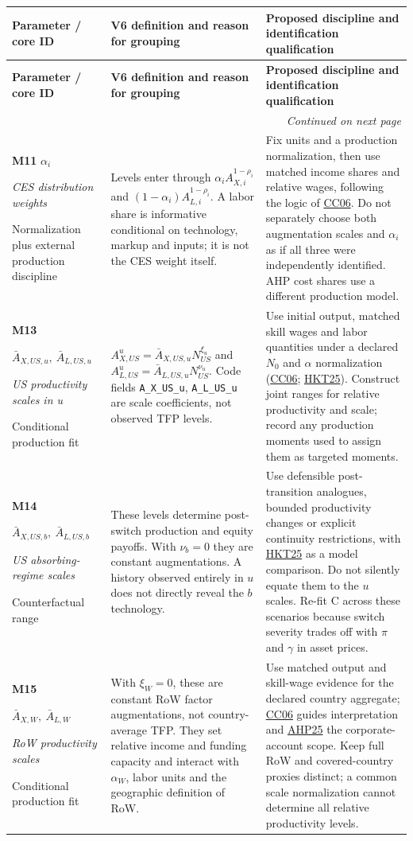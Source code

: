 \documentclass[10pt,a4paper,landscape]{article}
\makeatletter
\newcommand{\code}[1]{{\footnotesize\texttt{#1}}}
\newcommand{\lit}[2]{\hyperlink{ref:#1}{#2}}
\newenvironment{grouptable}{%
\fontsize{9.4}{10.8}\selectfont\setlength{\parskip}{1.5pt}
\begin{longtable}{@{}P{\dimexpr .18\textwidth-6.67pt\relax}P{\dimexpr .385\textwidth-6.67pt\relax}P{\dimexpr .435\textwidth-6.66pt\relax}@{}}
\toprule\rowcolor{tablehead}\textbf{Parameter / core ID} & \textbf{V6 definition and reason for grouping} & \textbf{Proposed discipline and identification qualification}\\\midrule
\endfirsthead
\toprule\rowcolor{tablehead}\textbf{Parameter / core ID} & \textbf{V6 definition and reason for grouping} & \textbf{Proposed discipline and identification qualification}\\\midrule
\endhead
\midrule\multicolumn{3}{r}{\footnotesize\itshape Continued on next page}\\\endfoot
\bottomrule\endlastfoot
}{\end{longtable}}
\makeatother
\begin{document}
\begin{grouptable}
\textbf{M11} $\alpha_i$\par \textit{CES distribution weights}\par {\footnotesize Normalization plus external production discipline} & Levels enter through $\alpha_iA_{X,i}^{1-\rho_i}$ and $(1-\alpha_i)A_{L,i}^{1-\rho_i}$. A labor share is informative conditional on technology, markup and inputs; it is not the CES weight itself. & Fix units and a production normalization, then use matched income shares and relative wages, following the logic of \lit{CC}{CC06}. Do not separately choose both augmentation scales and $\alpha_i$ as if all three were independently identified. AHP cost shares use a different production model.\\[3pt]
\textbf{M13}\par $\bar A_{X,US,u},\ \bar A_{L,US,u}$\par \textit{US productivity scales in u}\par {\footnotesize Conditional production fit} & $A^u_{X,US}=\bar A_{X,US,u}N_{US}^{\xi_u}$ and $A^u_{L,US}=\bar A_{L,US,u}N_{US}^{\nu_u}$. Code fields \code{A\_X\_US\_u}, \code{A\_L\_US\_u} are scale coefficients, not observed TFP levels. & Use initial output, matched skill wages and labor quantities under a declared $N_0$ and $\alpha$ normalization (\lit{CC}{CC06}; \lit{HKT}{HKT25}). Construct joint ranges for relative productivity and scale; record any production moments used to assign them as targeted moments.\\[3pt]
\textbf{M14}\par $\bar A_{X,US,b},\ \bar A_{L,US,b}$\par \textit{US absorbing-regime scales}\par {\footnotesize Counterfactual range} & These levels determine post-switch production and equity payoffs. With $\nu_b=0$ they are constant augmentations. A history observed entirely in $u$ does not directly reveal the $b$ technology. & Use defensible post-transition analogues, bounded productivity changes or explicit continuity restrictions, with \lit{HKT}{HKT25} as a model comparison. Do not silently equate them to the $u$ scales. Re-fit C across these scenarios because switch severity trades off with $\pi$ and $\gamma$ in asset prices.\\[3pt]
\textbf{M15}\par $\bar A_{X,W},\ \bar A_{L,W}$\par \textit{RoW productivity scales}\par {\footnotesize Conditional production fit} & With $\xi_W=0$, these are constant RoW factor augmentations, not country-average TFP. They set relative income and funding capacity and interact with $\alpha_W$, labor units and the geographic definition of RoW. & Use matched output and skill-wage evidence for the declared country aggregate; \lit{CC}{CC06} guides interpretation and \lit{AHP}{AHP25} the corporate-account scope. Keep full RoW and covered-country proxies distinct; a common scale normalization cannot determine all relative productivity levels.\\[3pt]

\end{grouptable}
\end{document}
